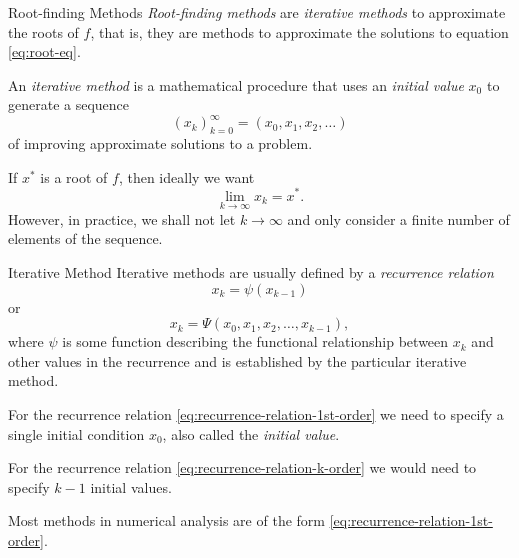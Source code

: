 \documentclass[12pt,aspectratio=169,envcountset]{beamer}
\begin{document}
\begin{frame}{Root-finding Methods}
  \emph{Root-finding methods} are \emph{iterative methods} to approximate the
  roots of $f$, that is, they are methods to approximate the solutions to
  equation \eqref{eq:root-eq}.

  An \emph{iterative method} is a mathematical procedure that uses an
  \emph{initial value} $x_0$ to generate a sequence   
  \[
    (x_k)_{k=0}^\infty = (x_0, x_1, x_2, \dotsc)
  \]
  of improving approximate solutions to a problem.

  If $x^*$ is a root of $f$, then ideally we want
  \[
    \lim_{k\to\infty} x_k = x^*.
  \]
  However, in practice, we shall not let $k \to \infty$ and only consider a
  finite number of elements of the sequence.
\end{frame}

\begin{frame}{Iterative Method}
  Iterative methods are usually defined by a \emph{recurrence relation}
  \begin{equation} \label{eq:recurrence-relation-1st-order}
    x_k = \psi(x_{k-1})
  \end{equation}
  or
  \begin{equation} \label{eq:recurrence-relation-k-order}
    x_k = \Psi(x_0, x_1, x_2, \dotsc, x_{k-1}),
  \end{equation}
  where $\psi$ is some function describing the functional relationship
  between $x_k$ and other values in the recurrence and is established by the
  particular iterative method.

  For the recurrence relation \eqref{eq:recurrence-relation-1st-order} we
  need to specify a single initial condition $x_0$, also called the
  \emph{initial value}.

  For the recurrence relation \eqref{eq:recurrence-relation-k-order} we would
  need to specify $k - 1$ initial values.

  Most methods in numerical analysis are of the form
  \eqref{eq:recurrence-relation-1st-order}.
\end{frame}
\end{document}
